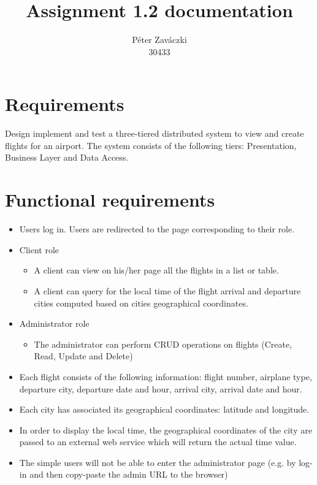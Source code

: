 \documentclass[a4paper,10pt]{report}
\title{Assignment 1.2 documentation}
\author{Péter Zaváczki\\30433}
\begin{document}
\maketitle

\section{Requirements}
Design implement and test a three-tiered distributed system to view and create flights for an airport.
The system consists of the following tiers: Presentation, Business Layer and Data Access.

\section{Functional requirements}
\begin{itemize}
    \item Users log in. Users are redirected to the page corresponding to their role. 
    \item Client role
    \begin{itemize}
        \item A client can view on his/her page all the flights in a list or table.
        \item A client can query for the local time of the flight arrival and departure cities computed based on cities geographical coordinates. 
    \end{itemize}
    \item Administrator role
    \begin{itemize}
        \item The administrator can perform CRUD operations on flights (Create, Read, Update and Delete) 
    \end{itemize}
    \item Each flight consists of the following information: flight number, airplane type, departure city, departure date and hour, arrival city, arrival date and hour. 
    \item Each city has associated its geographical coordinates: latitude and longitude.
    \item In order to display the local time, the geographical coordinates of the city are passed to an external web service which will return the actual time value. 
    \item The simple users will not be able to enter the administrator page (e.g. by log-in and then copy-paste the admin URL to the browser)
\end{itemize}
\end{document}
